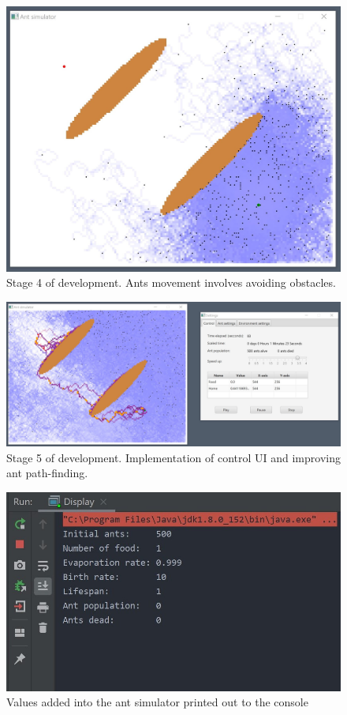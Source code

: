 \documentclass[a4paper, oneside, 11pt]{report}
\begin{document}
\begin{figure}[htb]
	\begin{center}
		\includegraphics[width=0.65 \columnwidth]{Stage_4.jpg}
		\caption{Stage 4 of development. Ants movement involves avoiding obstacles.}
		\label{fig:Stage 4}
	\end{center}
\end{figure}

\begin{figure}[htb]
	\begin{center}
		\includegraphics[width=1.0 \columnwidth]{Stage_5.jpg}
		\caption{Stage 5 of development. Implementation of control UI and improving ant path-finding.}
		\label{fig:Stage 5}
	\end{center}
\end{figure}

\begin{figure}[htb]
	\begin{center}
		\includegraphics[width=0.6 \columnwidth]{Ant_Simulator_Values.jpg}
		\caption{Values added into the ant simulator printed out to the console}
		\label{fig:Ant_Simulator_Values}
	\end{center}
\end{figure}
\end{document}
